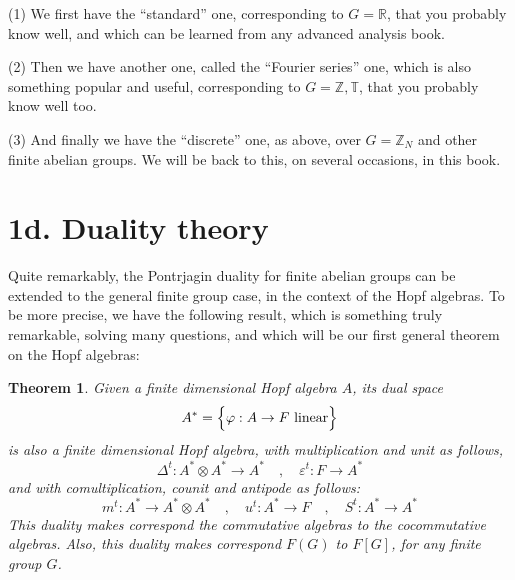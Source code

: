 \documentclass[12pt]{amsbook}
\newtheorem{theorem}{Theorem}[chapter]
\begin{document}
\medskip

(1) We first have the ``standard'' one, corresponding to $G=\mathbb R$, that you probably know well, and which can be learned from any advanced analysis book.

\medskip

(2) Then we have another one, called the ``Fourier series'' one, which is also something popular and useful, corresponding to $G=\mathbb Z,\mathbb T$, that you probably know well too.

\medskip

(3) And finally we have the ``discrete'' one, as above, over $G=\mathbb Z_N$ and other finite abelian groups. We will be back to this, on several occasions, in this book.

\section*{1d. Duality theory} 

Quite remarkably, the Pontrjagin duality for finite abelian groups can be extended to the general finite group case, in the context of the Hopf algebras. To be more precise, we have the following result, which is something truly remarkable, solving many questions, and which will be our first general theorem on the Hopf algebras:


\begin{theorem}
Given a finite dimensional Hopf algebra $A$, its dual space
$$A^*=\Big\{\varphi:A\to F\ {\rm linear}\Big\}$$
is also a finite dimensional Hopf algebra, with multiplication and unit as follows,
$$\Delta^t:A^*\otimes A^*\to A^*\quad,\quad \varepsilon^t:F\to A^*$$
and with comultiplication, counit and antipode as follows:
$$m^t:A^*\to A^*\otimes A^*\quad,\quad
u^t:A^*\to F\quad,\quad 
S^t:A^*\to A^*$$
This duality makes correspond the commutative algebras to the cocommutative algebras. Also, this duality makes correspond $F(G)$ to $F[G]$, for any finite group $G$.
\end{theorem}
\end{document}
